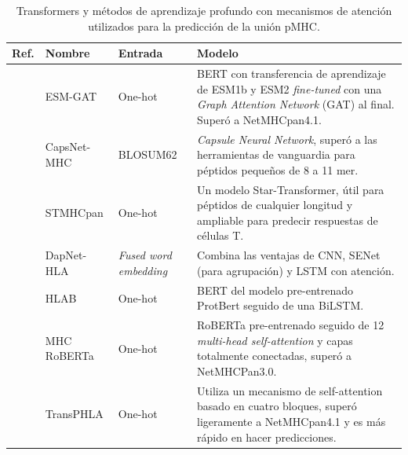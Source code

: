 \begin{table}[h]
	\caption{Transformers y métodos de aprendizaje profundo con mecanismos de atención utilizados para la predicción de la unión pMHC.}
	\label{tab:transformes}
	\setlength{\tabcolsep}{0.5em} %
	{\renewcommand{\arraystretch}{1.1}%
		
		\begin{scriptsize}
			
		
		\begin{tabular}{p{2.5cm}p{2.5cm}p{2cm}p{5.5cm}}
			\multicolumn{1}{l}{\textbf{Ref.}}                                   & \textbf{Nombre}             & \textbf{Entrada}            & \textbf{Modelo}     \\  \hline
			
			\cite{hashemi2023improved}&	ESM-GAT  &	One-hot & BERT con transferencia de aprendizaje de ESM1b y ESM2 \textit{fine-tuned} con una \textit{Graph Attention Network} (GAT) al final. Superó a NetMHCpan4.1.	\\
			
			
			\cite{kalemati2023capsnet}&	CapsNet-MHC&	BLOSUM62 & \textit{Capsule Neural Network}, superó a las herramientas de vanguardia para péptidos pequeños de 8 a 11 mer.	\\
			
			\cite{ye2023stmhcpan}&	STMHCpan  &	One-hot & Un modelo Star-Transformer, útil para péptidos de cualquier longitud y ampliable para predecir respuestas de células T.	\\
			
			\cite{jing2023dapnet}&	DapNet-HLA&	\textit{Fused word embedding} & Combina las ventajas de CNN, SENet (para agrupación) y LSTM con atención.	\\
			
			\cite{zhang2022hlab}&	HLAB&	One-hot & BERT del modelo pre-entrenado ProtBert seguido de una BiLSTM.	\\
			
			\cite{wang2022mhcroberta}          & MHC RoBERTa            & One-hot & RoBERTa pre-entrenado seguido de 12 \textit{multi-head self-attention} y capas totalmente conectadas, superó a NetMHCPan3.0.                                                                                          \\
			\cite{chu2022transformer}          & TransPHLA             & One-hot         & Utiliza un mecanismo de self-attention basado en cuatro bloques, superó ligeramente a NetMHCpan4.1 y es más rápido en hacer predicciones.\\
			

\end{tabular}
\end{scriptsize}}
\end{table}

